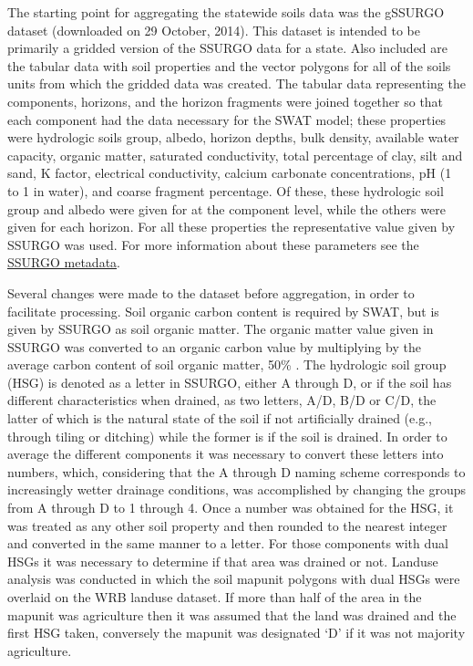 The starting point for aggregating the statewide soils data was the gSSURGO dataset (downloaded on 29 October, 2014). This dataset is intended to be primarily a gridded version of the SSURGO data for a state. Also included are the tabular data with soil properties and the vector polygons for all of the soils units from which the gridded data was created. The tabular data representing the components, horizons, and the horizon fragments were joined together so that each component had the data necessary for the SWAT model; these properties were hydrologic soils group, albedo, horizon depths, bulk density, available water capacity, organic matter, saturated conductivity, total percentage of clay, silt and sand, K factor, electrical conductivity, calcium carbonate concentrations, pH (1 to 1 in water), and coarse fragment percentage. Of these, these hydrologic soil group and albedo were given for at the component level, while the others were given for each horizon.  For all these properties the representative value given by SSURGO was used. For more information about these parameters see the \href{http://www.nrcs.usda.gov/wps/portal/nrcs/detail/soils/survey/?cid=nrcs142p2_053631}{SSURGO metadata}. 

Several changes were made to the dataset before aggregation, in order to facilitate processing. Soil organic carbon content is required by SWAT, but is given by SSURGO as soil organic matter. The organic matter value given in SSURGO was converted to an organic carbon value by multiplying by the average carbon content of soil organic matter, 50\% \citep{brady_introsoils_2002}. The hydrologic soil group (HSG) is denoted as a letter in SSURGO, either A through D, or if the soil has different characteristics when drained, as two letters, A/D, B/D or C/D, the latter of which is the natural state of the soil if not artificially drained (e.g., through tiling or ditching) while the former is if the soil is drained. In order to average the different components it was necessary to convert these letters into numbers, which, considering that the A through D naming scheme corresponds to increasingly wetter drainage conditions, was accomplished by changing the groups from A through D to 1 through 4. Once a number was obtained for the HSG, it was treated as any other soil property and then rounded to the nearest integer and converted in the same manner to a letter. For those components with dual HSGs it was necessary to determine if that area was drained or not. Landuse analysis was conducted in which the soil mapunit polygons with dual HSGs were overlaid on the WRB landuse dataset. If more than half of the area in the mapunit was agriculture then it was assumed that the land was drained and the first HSG taken, conversely the mapunit was designated `D' if it was not majority agriculture.

